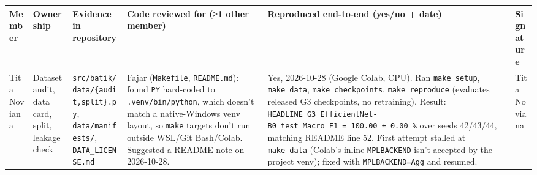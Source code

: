 \documentclass[10pt,a4paper]{article}
\newcounter{none} %
\begin{document}
{\def\LTcaptype{none} %
\begin{longtable}[]{@{}
  >{\raggedright\arraybackslash}p{}
  >{\raggedright\arraybackslash}p{}
  >{\raggedright\arraybackslash}p{}
  >{\raggedright\arraybackslash}p{}
  >{\raggedright\arraybackslash}p{}
  >{\raggedright\arraybackslash}p{}@{}}
\toprule\noalign{}
\begin{minipage}[b]{\linewidth}\raggedright
Member
\end{minipage} & \begin{minipage}[b]{\linewidth}\raggedright
Ownership
\end{minipage} & \begin{minipage}[b]{\linewidth}\raggedright
Evidence in repository
\end{minipage} & \begin{minipage}[b]{\linewidth}\raggedright
Code reviewed for (≥1 other member)
\end{minipage} & \begin{minipage}[b]{\linewidth}\raggedright
Reproduced end-to-end (yes/no + date)
\end{minipage} & \begin{minipage}[b]{\linewidth}\raggedright
Signature
\end{minipage} \\
\midrule\noalign{}
\endhead
\bottomrule\noalign{}
\endlastfoot
Tita Noviana & Dataset audit, data card, split, leakage check & \texttt{src/\allowbreak{}batik/\allowbreak{}data/\allowbreak{}\{audit,\allowbreak{}split\}.py}, \texttt{data/\allowbreak{}manifests/\allowbreak{}}, \texttt{DATA\_\allowbreak{}LICENSE.md} & Fajar (\texttt{Makefile}, \texttt{README.md}): found \texttt{PY} hard-coded to \texttt{.venv/\allowbreak{}bin/\allowbreak{}python}, which doesn't match a native-Windows venv layout, so \texttt{make} targets don't run outside WSL/Git Bash/Colab. Suggested a README note on 2026-10-28. & Yes, 2026-10-28 (Google Colab, CPU). Ran \texttt{make\ setup}, \texttt{make\ data}, \texttt{make\ checkpoints}, \texttt{make\ reproduce} (evaluates released G3 checkpoints, no retraining). Result: \texttt{HEADLINE\ G3\ EfficientNet-B0\ test\ Macro\ F1\ =\ 100.00\ ±\ 0.00\ \%} over seeds 42/43/44, matching README line 52. First attempt stalled at \texttt{make\ data} (Colab's inline \texttt{MPLBACKEND} isn't accepted by the project venv); fixed with \texttt{MPLBACKEND=Agg} and resumed. & Tita Noviana \\

\end{longtable}}
\end{document}
